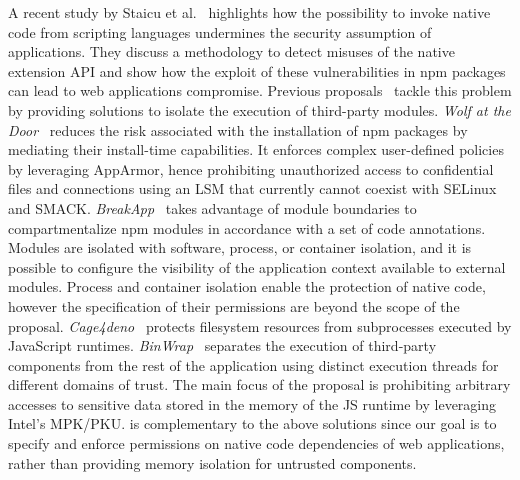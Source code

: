 A recent study by Staicu et al.~\cite{staicu2021bilingual} highlights
how the possibility to invoke native code from scripting languages
undermines the security assumption of applications. They discuss a
methodology to detect misuses of the native extension API and show how
the exploit of these vulnerabilities in npm packages can lead to web
applications compromise. Previous proposals~\cite{
  vasilakis2018breakapp, wyss2022wolf, binwrap} tackle this problem by
providing solutions to isolate the execution of third-party
modules. {\em Wolf at the Door}~\cite{wyss2022wolf} reduces the risk
associated with the installation of npm packages by mediating their
install-time capabilities. It enforces complex user-defined policies
by leveraging AppArmor, hence prohibiting unauthorized access to
confidential files and connections using an LSM that currently cannot
coexist with SELinux and SMACK. {\em BreakApp}~\cite{
  vasilakis2018breakapp} takes advantage of module boundaries to
compartmentalize npm modules in accordance with a set of code
annotations. Modules are isolated with software, process, or container
isolation, and it is possible to configure the visibility of the
application context available to external modules. Process and
container isolation enable the protection of native code, however the
specification of their permissions are beyond the scope of the
proposal.
{\em Cage4deno}~\cite{cage4deno} protects filesystem resources from subprocesses
executed by JavaScript runtimes.
{\em BinWrap}~\cite{binwrap} separates the execution of
third-party components from the rest of the application using distinct
execution threads for different domains of trust. The main focus
of the proposal is prohibiting arbitrary accesses to sensitive data
stored in the memory of the JS runtime by leveraging Intel's MPK/PKU.
\pap is complementary to the above solutions since our goal
is to specify and enforce permissions on native code dependencies of
web applications, rather than providing memory isolation for
untrusted components.

